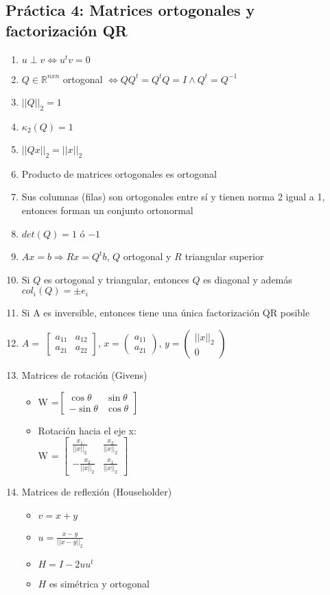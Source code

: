 \subsection*{Práctica 4: Matrices ortogonales y factorización QR}
\begin{enumerate}
    \item $u \perp v \iff u^tv=0$
    \item $Q \in \mathbb{R}^{nxn}$ ortogonal $\iff QQ^t=Q^tQ=I \land Q^t=Q^{-1}$
    \item $||Q||_2 = 1$
    \item $\kappa_2(Q) = 1$
    \item $||Qx||_2=||x||_2$
    \item Producto de matrices ortogonales es ortogonal
    \item Sus columnas (filas) son ortogonales entre sí y tienen norma 2 igual a 1, entonces forman un conjunto ortonormal
    \item $det(Q)= 1$ ó $-1$
    \item $Ax=b \Rightarrow Rx=Q^tb$,  $Q$ ortogonal y $R$ triangular superior
    \item Si $Q$ es ortogonal y triangular, entonces $Q$ es diagonal y además $col_i(Q)=\pm e_i$
    \item Si A es inversible, entonces tiene una única factorización QR posible
    \item $A =$ $ \begin{bmatrix}
a_{11} & a_{12} \\
a_{21} & a_{22} 
\end{bmatrix}  $, $x = \begin{pmatrix}
a_{11} \\
a_{21} 
\end{pmatrix}$, $y =  \begin{pmatrix}
||x||_2 \\
0 
\end{pmatrix}  $
    \item Matrices de rotación (Givens)
    \begin{itemize}
        \item W =$ \begin{bmatrix}
\cos{\theta} & \sin{\theta} \\
-\sin{\theta} & \cos{\theta} 
\end{bmatrix}  $
        \item Rotación hacia el eje x:\\
        W = $ \begin{bmatrix}
\frac{x_1}{||x||_2} & \frac{x_2}{||x||_2} \\
-\frac{x_2}{||x||_2} & \frac{x_1}{||x||_2} 
\end{bmatrix}  $
    \end{itemize}
    \item Matrices de reflexión (Householder)
    \begin{itemize}
        \item $v = x + y$
        \item $u = \frac{x-y}{||x-y||_2}$
        \item $H = I - 2uu^t$
        \item $H$ es simétrica y ortogonal
    \end{itemize}
\end{enumerate}